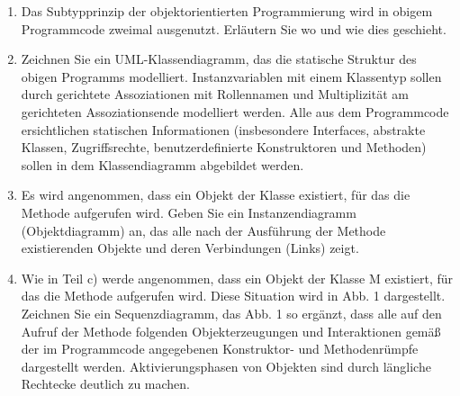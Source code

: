 \documentclass{bschlangaul-aufgabe}
\begin{document}
\begin{enumerate}


\item Das
Subtypprinzip
der objektorientierten Programmierung wird in obigem Programmcode
zweimal ausgenutzt. Erläutern Sie wo und wie dies geschieht.


\item Zeichnen Sie ein UML-Klassendiagramm, das
die statische Struktur des obigen Programms modelliert. Instanzvariablen
mit einem Klassentyp sollen durch gerichtete Assoziationen mit
Rollennamen und Multiplizität am gerichteten Assoziationsende modelliert
werden. Alle aus dem Programmcode ersichtlichen statischen Informationen
(insbesondere Interfaces, abstrakte Klassen, Zugriffsrechte,
benutzerdefinierte Konstruktoren und Methoden) sollen in dem
Klassendiagramm abgebildet werden.

\begin{bAntwort}
\end{bAntwort}


\item Es wird angenommen, dass ein Objekt der Klasse 
existiert, für das die Methode  aufgerufen wird. Geben
Sie ein Instanzendiagramm (Objektdiagramm) an, das
alle nach der Ausführung der Methode  existierenden Objekte
und deren Verbindungen (Links) zeigt.

\begin{bAntwort}
\bMetaNochKeineLoesung
\end{bAntwort}


\item Wie in Teil c) werde angenommen, dass ein Objekt der Klasse M
existiert, für das die Methode  aufgerufen wird. Diese
Situation wird in Abb. 1 dargestellt. Zeichnen Sie ein
Sequenzdiagramm, das Abb. 1 so ergänzt, dass alle
auf den Aufruf der Methode  folgenden Objekterzeugungen und
Interaktionen gemäß der im Programmcode angegebenen Konstruktor- und
Methodenrümpfe dargestellt werden. Aktivierungsphasen von Objekten sind
durch längliche Rechtecke deutlich zu machen.


\end{enumerate}
\end{document}
